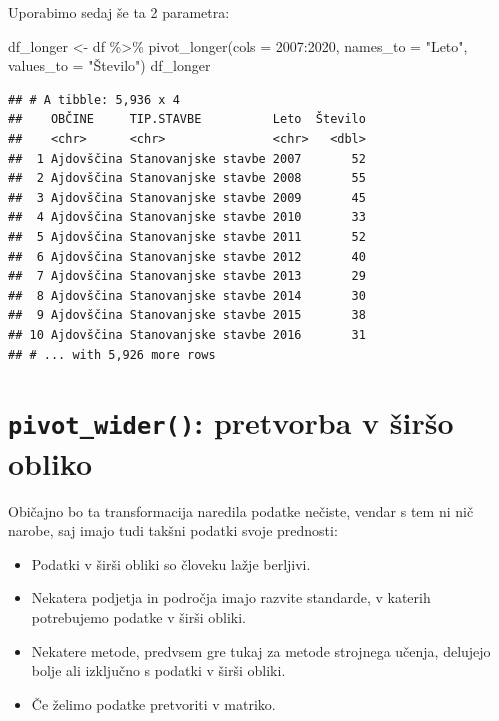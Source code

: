 \documentclass[
]{book}
\newenvironment{Shaded}{\begin{snugshade}}{\end{snugshade}}
\newcommand{\AttributeTok}[1]{\textcolor[rgb]{0.77,0.63,0.00}{#1}}
\newcommand{\FunctionTok}[1]{\textcolor[rgb]{0.00,0.00,0.00}{#1}}
\newcommand{\NormalTok}[1]{#1}
\newcommand{\OtherTok}[1]{\textcolor[rgb]{0.56,0.35,0.01}{#1}}
\newcommand{\SpecialCharTok}[1]{\textcolor[rgb]{0.00,0.00,0.00}{#1}}
\newcommand{\StringTok}[1]{\textcolor[rgb]{0.31,0.60,0.02}{#1}}
\providecommand{\tightlist}{%
  \setlength{\itemsep}{0pt}\setlength{\parskip}{0pt}}
\begin{document}
Uporabimo sedaj še ta 2 parametra:

\begin{Shaded}
\begin{Highlighting}[]
\NormalTok{df\_longer }\OtherTok{\textless{}{-}}\NormalTok{ df }\SpecialCharTok{\%\textgreater{}\%} \FunctionTok{pivot\_longer}\NormalTok{(}\AttributeTok{cols =} \StringTok{\textasciigrave{}}\AttributeTok{2007}\StringTok{\textasciigrave{}}\SpecialCharTok{:}\StringTok{\textasciigrave{}}\AttributeTok{2020}\StringTok{\textasciigrave{}}\NormalTok{, }
                                 \AttributeTok{names\_to =} \StringTok{"Leto"}\NormalTok{, }
                                 \AttributeTok{values\_to =} \StringTok{"Število"}\NormalTok{)}
\NormalTok{df\_longer}
\end{Highlighting}
\end{Shaded}

\begin{verbatim}
## # A tibble: 5,936 x 4
##    OBČINE     TIP.STAVBE          Leto  Število
##    <chr>      <chr>               <chr>   <dbl>
##  1 Ajdovščina Stanovanjske stavbe 2007       52
##  2 Ajdovščina Stanovanjske stavbe 2008       55
##  3 Ajdovščina Stanovanjske stavbe 2009       45
##  4 Ajdovščina Stanovanjske stavbe 2010       33
##  5 Ajdovščina Stanovanjske stavbe 2011       52
##  6 Ajdovščina Stanovanjske stavbe 2012       40
##  7 Ajdovščina Stanovanjske stavbe 2013       29
##  8 Ajdovščina Stanovanjske stavbe 2014       30
##  9 Ajdovščina Stanovanjske stavbe 2015       38
## 10 Ajdovščina Stanovanjske stavbe 2016       31
## # ... with 5,926 more rows
\end{verbatim}

\hypertarget{pivot_wider-pretvorba-v-ux161irux161o-obliko}{%
\section{\texorpdfstring{\texttt{pivot\_wider()}: pretvorba v širšo obliko}{pivot\_wider(): pretvorba v širšo obliko}}\label{pivot_wider-pretvorba-v-ux161irux161o-obliko}}

Običajno bo ta transformacija naredila podatke nečiste, vendar s tem ni nič narobe, saj imajo tudi takšni podatki svoje prednosti:

\begin{itemize}
\tightlist
\item
  Podatki v širši obliki so človeku lažje berljivi.
\item
  Nekatera podjetja in področja imajo razvite standarde, v katerih potrebujemo podatke v širši obliki.
\item
  Nekatere metode, predvsem gre tukaj za metode strojnega učenja, delujejo bolje ali izključno s podatki v širši obliki.
\item
  Če želimo podatke pretvoriti v matriko.
\end{itemize}
\end{document}
